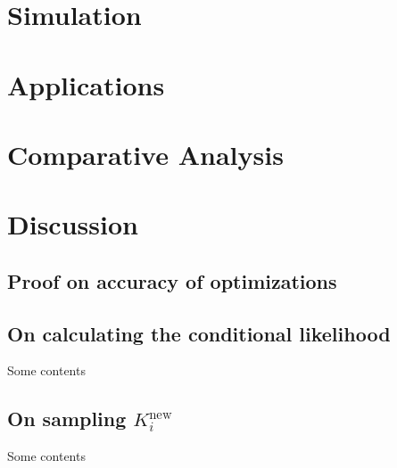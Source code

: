 \documentclass{article}
\begin{document}
\section{Simulation}

\section{Applications}

\section{Comparative Analysis}

\section{Discussion}




\newpage
\begin{appendices}
  \section{Proof on accuracy of optimizations}
  \subsection{On calculating the conditional likelihood}\label{app::proof1}
    Some contents
  \subsection{On sampling $K_i^\text{new}$}\label{app::proof2}
    Some contents
\end{appendices}
\end{document}
